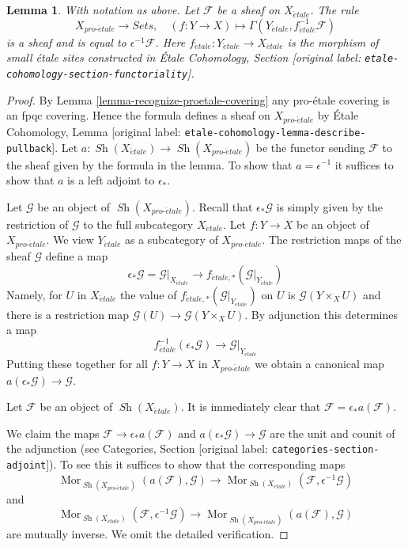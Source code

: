 \documentclass[10pt,a4paper]{article}
\theoremstyle{plain}
\newtheorem{lemma}[subsection]{Lemma}
\theoremstyle{definition}
\theoremstyle{remark}
\numberwithin{equation}{subsection}
\def\Mor{\mathop{\mathrm{Mor}}\nolimits}
\def\Sh{\mathop{\mathit{Sh}}\nolimits}
\def\proetale{{pro\text{-}\acute{e}tale}}
\def\etale{{\acute{e}tale}}
\begin{document}
\begin{lemma}
\label{lemma-describe-pullback-from-etale}
With notation as above. Let $\mathcal{F}$ be a sheaf on $X_\etale$.
The rule
$$
X_\proetale \longrightarrow \textit{Sets},\quad
(f : Y \to X) \longmapsto \Gamma(Y_\etale, f_\etale^{-1}\mathcal{F})
$$
is a sheaf and is equal to $\epsilon^{-1}\mathcal{F}$.
Here $f_\etale : Y_\etale \to X_\etale$ is the morphism of
small \'etale sites constructed in
\'Etale Cohomology, Section \textnormal{[original label: \nolinkurl{etale-cohomology-section-functoriality}]}.
\end{lemma}

\begin{proof}
By Lemma \ref{lemma-recognize-proetale-covering} any pro-\'etale covering
is an fpqc covering. Hence the formula defines a sheaf on $X_\proetale$
by \'Etale Cohomology, Lemma \textnormal{[original label: \nolinkurl{etale-cohomology-lemma-describe-pullback}]}.
Let $a : \Sh(X_\etale) \to \Sh(X_\proetale)$ be the functor
sending $\mathcal{F}$ to the sheaf given by the formula in the lemma.
To show that $a = \epsilon^{-1}$ it suffices to show that $a$ is a
left adjoint to $\epsilon_*$.

\medskip\noindent
Let $\mathcal{G}$ be an object of $\Sh(X_\proetale)$.
Recall that $\epsilon_*\mathcal{G}$ is simply given by the restriction of
$\mathcal{G}$ to the full subcategory $X_\etale$.
Let $f : Y \to X$ be an object of $X_\proetale$.
We view $Y_\etale$ as a subcategory of $X_\proetale$.
The restriction maps of the sheaf $\mathcal{G}$ define a map
$$
\epsilon_*\mathcal{G} = \mathcal{G}|_{X_\etale}
\longrightarrow
f_{\etale, *}(\mathcal{G}|_{Y_\etale})
$$
Namely, for $U$ in $X_\etale$ the value of
$f_{\etale, *}(\mathcal{G}|_{Y_\etale})$ on $U$
is $\mathcal{G}(Y \times_X U)$ and there is a restriction
map $\mathcal{G}(U) \to \mathcal{G}(Y \times_X U)$.
By adjunction this determines a map
$$
f_\etale^{-1}(\epsilon_*\mathcal{G}) \to \mathcal{G}|_{Y_\etale}
$$
Putting these together for all $f : Y \to X$ in $X_\proetale$
we obtain a canonical map $a(\epsilon_*\mathcal{G}) \to \mathcal{G}$.

\medskip\noindent
Let $\mathcal{F}$ be an object of $\Sh(X_\etale)$. It is immediately
clear that $\mathcal{F} = \epsilon_*a(\mathcal{F})$.

\medskip\noindent 
We claim the maps $\mathcal{F} \to \epsilon_*a(\mathcal{F})$ and
$a(\epsilon_*\mathcal{G}) \to \mathcal{G}$
are the unit and counit of the adjunction (see
Categories, Section \textnormal{[original label: \nolinkurl{categories-section-adjoint}]}).
To see this it suffices to show that the corresponding maps
$$
\Mor_{\Sh(X_\proetale)}(a(\mathcal{F}), \mathcal{G}) \to
\Mor_{\Sh(X_\etale)}(\mathcal{F}, \epsilon^{-1}\mathcal{G})
$$
and
$$
\Mor_{\Sh(X_\etale)}(\mathcal{F}, \epsilon^{-1}\mathcal{G}) \to
\Mor_{\Sh(X_\proetale)}(a(\mathcal{F}), \mathcal{G})
$$
are mutually inverse. We omit the detailed verification.
\end{proof}
\end{document}
